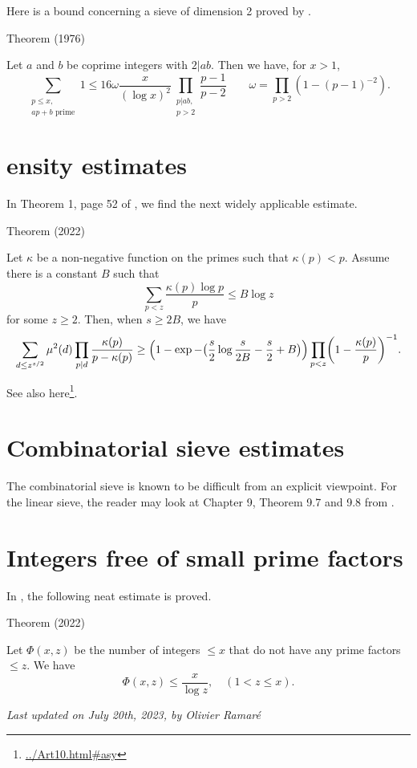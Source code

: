 \par 
Here is a bound concerning a sieve of dimension 2 proved by
\cite{Siebert*76}.
\par 
\begin{thm}{Theorem (1976)}

Let $a$ and $b$ be coprime integers with $2|ab$. Then we have, for $x>1$,
$$
\sum_{\substack{p\le x,\\ \text{$ap+b$ prime}}}1
\le 16 \omega\frac{x}{(\log x)^2}\prod_{\substack{p|ab,\\ p >
2}}\frac{p-1}{p-2}
\qquad \omega=\prod_{p > 2}(1-(p-1)^{-2}).
$$
\end{thm}


\section{ensity estimates }


In Theorem 1, page 52 of
\cite{Greaves*01},
we find the next widely applicable estimate.
\par 
\begin{thm}{Theorem (2022)}

    Let $\kappa$ be a non-negative function on the primes such that
    $\kappa(p) < p$. Assume there is a constant $B$ such that
		 $$
		 \sum_{p < z} \frac{\kappa(p)\log p}{p}
			   \le B\log z
			   $$
			   for some $z\ge 2$. Then, when $s\ge 2B$, we
			   have
			   $$
			   \sum_{d\le z^{s/2}}\mu^2(d)
			   \prod_{p|d}\frac{\kappa(p)}{p-\kappa(p)}
			   \ge
			   \Bigl(1-\exp-\bigl(\frac{s}{2}\log\frac{s}{2B}-\frac{s}{2}+B\bigr)\Bigr)
			   \prod_{p < z}\biggl(1-\frac{\kappa(p)}{p}\biggr)^{-1}.
			   $$
\end{thm}

See also here\footnote{\url{../Art10.html#asy}}.


\section{Combinatorial sieve estimates}


The combinatorial sieve is known to be difficult from an explicit
viewpoint. For the linear sieve, the reader may look at Chapter 9,
Theorem 9.7 and 9.8 from
\cite{Nathanson*96-2}.


\section{Integers free of small prime factors}


In
\cite{Fan*22}, 
the following neat estimate is proved.
\par 
\begin{thm}{Theorem (2022)}

Let $\Phi(x,z)$ be the number of integers $\le x$ that do not have any
prime factors $\le z$. We have
$$
\Phi(x,z)\le \frac{x}{\log z},
\quad(1 < z\le x).
$$
\end{thm}







  
\begin{flushright}\small\sl{}   Last updated on July 20th, 2023, by Olivier Ramar\'e
 \end{flushright}














